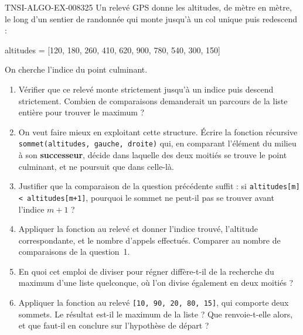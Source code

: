 \begin{exercice}{TNSI-ALGO-EX-008}{3}{25}
Un relevé GPS donne les altitudes, de mètre en mètre, le long d'un sentier de
randonnée qui monte jusqu'à un col unique puis redescend :
\begin{python}
altitudes = [120, 180, 260, 410, 620, 900, 780, 540, 300, 150]
\end{python}
On cherche l'indice du point culminant.
\begin{enumerate}
  \item Vérifier que ce relevé monte strictement jusqu'à un indice puis descend
    strictement. Combien de comparaisons demanderait un parcours de la liste
    entière pour trouver le maximum ?
  \item On veut faire mieux en exploitant cette structure. Écrire la fonction
    récursive \lstinline{sommet(altitudes, gauche, droite)} qui, en comparant
    l'élément du milieu à son \textbf{successeur}, décide dans laquelle des deux
    moitiés se trouve le point culminant, et ne poursuit que dans celle-là.
  \item Justifier que la comparaison de la question précédente suffit : si
    \lstinline{altitudes[m] < altitudes[m+1]}, pourquoi le sommet ne peut-il pas
    se trouver avant l'indice $m+1$ ?
  \item Appliquer la fonction au relevé et donner l'indice trouvé, l'altitude
    correspondante, et le nombre d'appels effectués. Comparer au nombre de
    comparaisons de la question~1.
  \item En quoi cet emploi de diviser pour régner diffère-t-il de la recherche
    du maximum d'une liste quelconque, où l'on divise également en deux moitiés ?
  \item Appliquer la fonction au relevé \lstinline{[10, 90, 20, 80, 15]}, qui
    comporte deux sommets. Le résultat est-il le maximum de la liste ? Que
    renvoie-t-elle alors, et que faut-il en conclure sur l'hypothèse de départ ?
\end{enumerate}
\end{exercice}
